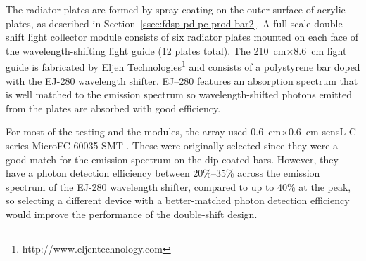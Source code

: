 The radiator plates are formed by spray-coating  on the outer surface of acrylic plates, as described in Section~\ref{ssec:fdsp-pd-pc-prod-bar2}.
A full-scale double-shift light collector module consists of six radiator plates mounted on each face of the wavelength-shifting light guide (12 plates total). The \SI{210}{cm}$\times$\SI{8.6}{cm} light guide is fabricated by Eljen Technologies\footnote{http://www.eljentechnology.com} and consists of a polystyrene bar doped with the EJ-280 wavelength shifter. 
EJ--280 features an absorption spectrum that is well matched to the  emission spectrum so wavelength-shifted photons emitted from the plates are absorbed with good efficiency. 

For most of the testing and the  modules,  the  array used \SI{0.6}{cm}$\times$\SI{0.6}{cm} sensL C-series MicroFC-60035-SMT . These were originally selected since they were a good match for the  emission spectrum on the dip-coated bars. However, they have a photon detection efficiency between 20\%--35\% across the emission spectrum of the EJ-280 wavelength shifter, compared to up to 40\% at the peak, so selecting a different device with a better-matched photon detection efficiency would improve the  performance of the double-shift design.

